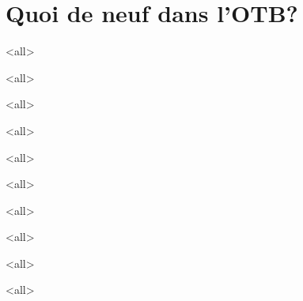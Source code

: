 \section{Quoi de neuf dans l'OTB?}

\mode<all>


\mode<all>


\mode<all>


\mode<all>


\mode<all>


\mode<all>


\mode<all>


\mode<all>


\mode<all>


\mode<all>


